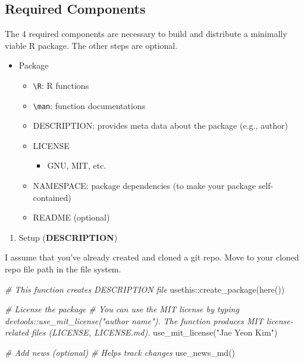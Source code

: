 \documentclass[
]{book}
\newenvironment{Shaded}{\begin{snugshade}}{\end{snugshade}}
\newcommand{\CommentTok}[1]{\textcolor[rgb]{0.56,0.35,0.01}{\textit{#1}}}
\newcommand{\FunctionTok}[1]{\textcolor[rgb]{0.00,0.00,0.00}{#1}}
\newcommand{\NormalTok}[1]{#1}
\newcommand{\SpecialCharTok}[1]{\textcolor[rgb]{0.00,0.00,0.00}{#1}}
\newcommand{\StringTok}[1]{\textcolor[rgb]{0.31,0.60,0.02}{#1}}
\providecommand{\tightlist}{%
  \setlength{\itemsep}{0pt}\setlength{\parskip}{0pt}}
\begin{document}
\hypertarget{required-components}{%
\subsection{Required Components}\label{required-components}}

The 4 required components are necessary to build and distribute a minimally viable R package. The other steps are optional.

\begin{itemize}
\tightlist
\item
  Package

  \begin{itemize}
  \tightlist
  \item
    \texttt{\textbackslash{}R}: R functions
  \item
    \texttt{\textbackslash{}man}: function documentations
  \item
    DESCRIPTION: provides meta data about the package (e.g., author)
  \item
    LICENSE

    \begin{itemize}
    \tightlist
    \item
      GNU, MIT, etc.
    \end{itemize}
  \item
    NAMESPACE: package dependencies (to make your package self-contained)
  \item
    README (optional)
  \end{itemize}
\end{itemize}

\begin{enumerate}
\def\labelenumi{\arabic{enumi}.}
\tightlist
\item
  Setup (\textbf{DESCRIPTION})
\end{enumerate}

I assume that you've already created and cloned a git repo. Move to your cloned repo file path in the file system.

\begin{Shaded}
\begin{Highlighting}[]
\CommentTok{\# This function creates DESCRIPTION file }
\NormalTok{usethis}\SpecialCharTok{::}\FunctionTok{create\_package}\NormalTok{(}\FunctionTok{here}\NormalTok{())}

\CommentTok{\# License the package }
\CommentTok{\# You can use the MIT license by typing devtools::use\_mit\_license("author name"). The function produces MIT license{-}related files (LICENSE, LICENSE.md).}
\FunctionTok{use\_mit\_license}\NormalTok{(}\StringTok{"Jae Yeon Kim"}\NormalTok{)}

\CommentTok{\# Add news (optional) }
\CommentTok{\# Helps track changes }
\FunctionTok{use\_news\_md}\NormalTok{() }
\end{Highlighting}
\end{Shaded}
\end{document}
